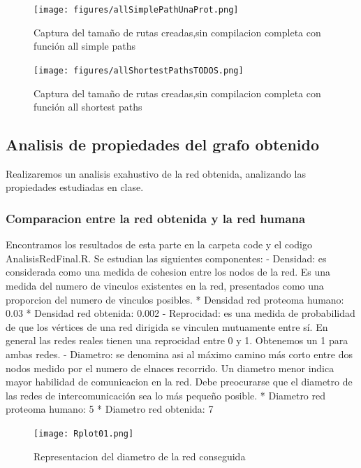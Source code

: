 \begin{figure}[ht!]
	\centering
	\texttt{[image: figures/allSimplePathUnaProt.png]}
	\caption{Captura del tamaño de rutas creadas,sin compilacion completa con función all simple paths}
\end{figure}

\begin{figure}[ht!]
	\centering
	\texttt{[image: figures/allShortestPathsTODOS.png]}
	\caption{Captura del tamaño de rutas creadas,sin compilacion completa con función all shortest paths}
\end{figure}



\subsection{Analisis de propiedades del grafo obtenido}
Realizaremos un analisis exahustivo de la red obtenida, analizando las propiedades estudiadas en clase.

\subsubsection{Comparacion entre la red obtenida y la red humana}
Encontramos los resultados de esta parte en la carpeta code y el codigo AnalisisRedFinal.R. Se estudian las siguientes componentes:
- Densidad: es considerada como una medida de cohesion entre los nodos de la red. Es una medida del numero de vinculos existentes en la red, presentados como una proporcion del numero de vinculos posibles. 
  * Densidad red proteoma humano: 0.03
  * Densidad red obtenida: 0.002
- Reprocidad: es una medida de probabilidad de que los vértices de una red dirigida se vinculen mutuamente entre sí. En general las redes reales tienen una reprocidad entre 0 y 1. Obtenemos un 1 para ambas redes.
- Diametro: se denomina asi al máximo camino más corto entre dos nodos medido por el numero de elnaces recorrido. Un diametro menor indica mayor habilidad de comunicacion en la red. Debe preocurarse que el diametro de las redes de intercomunicación sea lo más pequeño posible. 
  * Diametro red proteoma humano: 5
  * Diametro red obtenida: 7
  
  \begin{figure}[ht!]
	\centering
	\texttt{[image: Rplot01.png]}
	\caption{Representacion del diametro de la red conseguida}
\end{figure}

